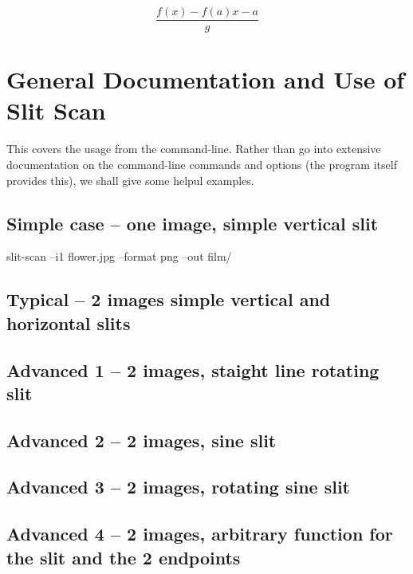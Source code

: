 \documentclass[letterpaper, 11pt]{article}
\begin{document}

$$
 \frac{f(x)-f(a) x-a}g
$$

\section{General Documentation and Use of Slit Scan}
\label{sec:org2b5babf}
This covers the usage from the command-line. Rather than go into extensive documentation
on the command-line commands and options (the program itself provides this), we shall
give some helpul examples.
\subsection{Simple case -- one image, simple vertical slit}
\label{sec:orge102699}
slit-scan --i1 flower.jpg --format png --out film/

\subsection{Typical -- 2 images simple vertical and horizontal slits}
\label{sec:orgd9df231}
\subsection{Advanced 1 -- 2 images, staight line rotating slit}
\label{sec:org1383a86}
\subsection{Advanced 2 -- 2 images, sine slit}
\label{sec:org3269564}
\subsection{Advanced 3 -- 2 images, rotating sine slit}
\label{sec:org0e61387}
\subsection{Advanced 4 -- 2 images, arbitrary function for the slit and the 2 endpoints}
\label{sec:org889da5c}
\end{document}
